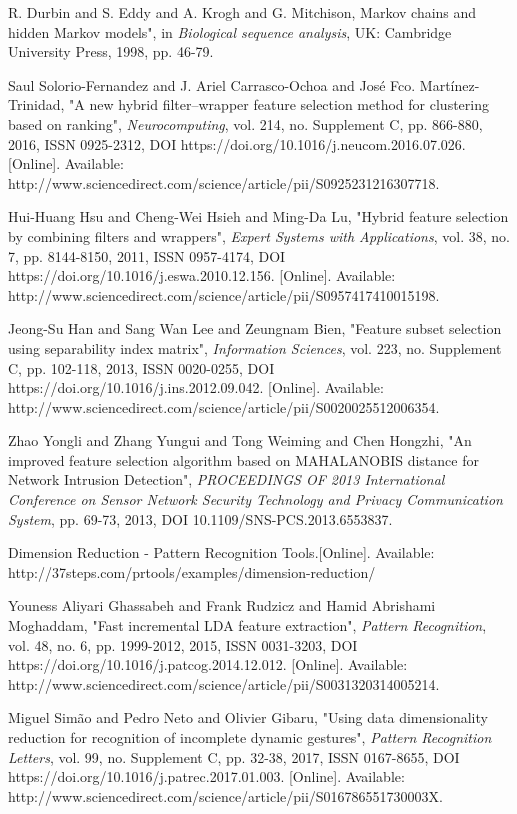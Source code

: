 \begin{thebibliography}{5}
 R. Durbin and S. Eddy and A. Krogh and G. Mitchison, Markov chains and hidden Markov models", in \emph{Biological sequence analysis}, UK: Cambridge University Press, 1998, pp. 46-79.

 Saul Solorio-Fernandez and J. Ariel Carrasco-Ochoa and José Fco. Martínez-Trinidad, "A new hybrid filter–wrapper feature selection method for clustering based on ranking", \emph{Neurocomputing}, vol. 214, no. Supplement C, pp. 866-880, 2016, ISSN 0925-2312, DOI https://doi.org/10.1016/j.neucom.2016.07.026. [Online]. Available: http://www.sciencedirect.com/science/article/pii/S0925231216307718. 

 Hui-Huang Hsu and Cheng-Wei Hsieh and Ming-Da Lu, "Hybrid feature selection by combining filters and wrappers", \emph{Expert Systems with Applications}, vol. 38, no. 7, pp. 8144-8150, 2011, ISSN 0957-4174, DOI https://doi.org/10.1016/j.eswa.2010.12.156. [Online]. Available: http://www.sciencedirect.com/science/article/pii/S0957417410015198. 

 Jeong-Su Han and Sang Wan Lee and Zeungnam Bien, "Feature subset selection using separability index matrix", \emph{Information Sciences}, vol. 223, no. Supplement C, pp. 102-118, 2013, ISSN 0020-0255, DOI https://doi.org/10.1016/j.ins.2012.09.042. [Online]. Available: http://www.sciencedirect.com/science/article/pii/S0020025512006354. 

 Zhao Yongli and Zhang Yungui and Tong Weiming and Chen Hongzhi, "An improved feature selection algorithm based on MAHALANOBIS distance for Network Intrusion Detection", \emph{PROCEEDINGS OF 2013 International Conference on Sensor Network Security Technology and Privacy Communication System}, pp. 69-73, 2013, DOI 10.1109/SNS-PCS.2013.6553837.

 Dimension Reduction - Pattern Recognition Tools.[Online]. Available: http://37steps.com/prtools/examples/dimension-reduction/

 Youness Aliyari Ghassabeh and Frank Rudzicz and Hamid Abrishami Moghaddam, "Fast incremental LDA feature extraction", \emph{Pattern Recognition}, vol. 48, no. 6, pp. 1999-2012, 2015, ISSN 0031-3203, DOI https://doi.org/10.1016/j.patcog.2014.12.012. [Online]. Available: http://www.sciencedirect.com/science/article/pii/S0031320314005214.

 Miguel Simão and Pedro Neto and Olivier Gibaru, "Using data dimensionality reduction for recognition of incomplete dynamic gestures", \emph{Pattern Recognition Letters}, vol. 99, no. Supplement C, pp. 32-38, 2017, ISSN 0167-8655, DOI https://doi.org/10.1016/j.patrec.2017.01.003. [Online]. Available: http://www.sciencedirect.com/science/article/pii/S016786551730003X.


\end{thebibliography}
